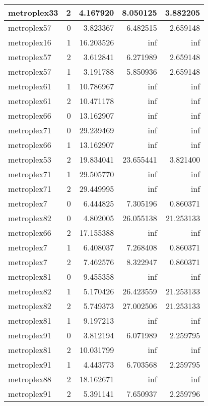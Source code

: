 \begin{longtable}{|l|r|r|r|r|}
metroplex33 & 2 & 4.167920 & 8.050125 & 3.882205 \\\hline
metroplex57 & 0 & 3.823367 & 6.482515 & 2.659148 \\\hline
metroplex16 & 1 & 16.203526 & inf & inf \\\hline
metroplex57 & 2 & 3.612841 & 6.271989 & 2.659148 \\\hline
metroplex57 & 1 & 3.191788 & 5.850936 & 2.659148 \\\hline
metroplex61 & 1 & 10.786967 & inf & inf \\\hline
metroplex61 & 2 & 10.471178 & inf & inf \\\hline
metroplex66 & 0 & 13.162907 & inf & inf \\\hline
metroplex71 & 0 & 29.239469 & inf & inf \\\hline
metroplex66 & 1 & 13.162907 & inf & inf \\\hline
metroplex53 & 2 & 19.834041 & 23.655441 & 3.821400 \\\hline
metroplex71 & 1 & 29.505770 & inf & inf \\\hline
metroplex71 & 2 & 29.449995 & inf & inf \\\hline
metroplex7 & 0 & 6.444825 & 7.305196 & 0.860371 \\\hline
metroplex82 & 0 & 4.802005 & 26.055138 & 21.253133 \\\hline
metroplex66 & 2 & 17.155388 & inf & inf \\\hline
metroplex7 & 1 & 6.408037 & 7.268408 & 0.860371 \\\hline
metroplex7 & 2 & 7.462576 & 8.322947 & 0.860371 \\\hline
metroplex81 & 0 & 9.455358 & inf & inf \\\hline
metroplex82 & 1 & 5.170426 & 26.423559 & 21.253133 \\\hline
metroplex82 & 2 & 5.749373 & 27.002506 & 21.253133 \\\hline
metroplex81 & 1 & 9.197213 & inf & inf \\\hline
metroplex91 & 0 & 3.812194 & 6.071989 & 2.259795 \\\hline
metroplex81 & 2 & 10.031799 & inf & inf \\\hline
metroplex91 & 1 & 4.443773 & 6.703568 & 2.259795 \\\hline
metroplex88 & 2 & 18.162671 & inf & inf \\\hline
metroplex91 & 2 & 5.391141 & 7.650937 & 2.259796 \\\hline
\end{longtable}

